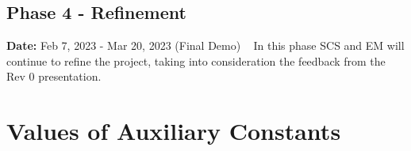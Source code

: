 \documentclass[12pt]{article}
\begin{document}
\subsection{Phase 4 - Refinement}
\textbf{Date:} Feb 7, 2023 - Mar 20, 2023 (Final Demo)
\ \newline\newline
In this phase SCS and EM will continue to refine the project, taking into consideration the feedback from the Rev 0 presentation.

\section{Values of Auxiliary Constants}
\label{sec_ac}


\end{document}
